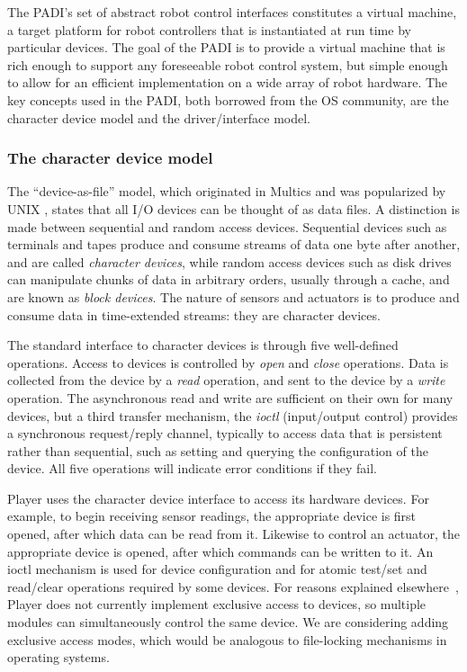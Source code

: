 The PADI's set of abstract robot control interfaces constitutes a virtual
machine, a target platform for robot controllers that is instantiated at
run time by particular devices.  The goal of the PADI is to provide a
virtual machine that is rich enough to support any foreseeable robot control
system, but simple enough to allow for an efficient implementation on a
wide array of robot hardware.  The key concepts used in the PADI, both
borrowed from the OS community, are the character device model and the
driver/interface model.

\subsubsection{The character device model}
The ``device-as-file'' model, which originated in Multics
\cite{32_FeiertagOrganick71} and was popularized by UNIX
\cite{32_RitchieThompson74}, states that all I/O devices can be thought of as
data files. A distinction is made between sequential and random access
devices. Sequential devices such as terminals and tapes produce and consume
streams of data one byte after another, and are called {\em character
devices}, while random access devices such as disk drives can manipulate
chunks of data in arbitrary orders, usually through a cache, and are known
as {\em block devices}. The nature of sensors and actuators is to produce
and consume data in time-extended streams: they are character devices.

The standard interface to character devices is through five
well-defined operations. Access to devices is controlled by {\em open}
and {\em close} operations. Data is collected from the device by a
{\em read} operation, and sent to the device by a {\em write}
operation.  The asynchronous read and write are sufficient on their
own for many devices, but a third transfer mechanism, the {\em ioctl}
(input/output control) provides a synchronous request/reply channel,
typically to access data that is persistent rather than sequential,
such as setting and querying the configuration of the device. All five
operations will indicate error conditions if they fail.

Player uses the character device interface to access its hardware devices.
For example, to begin receiving sensor readings, the appropriate device is
first opened, after which data can be read from it.  Likewise to control
an actuator, the appropriate device is opened, after which commands can be
written to it.  An ioctl mechanism is used for device configuration and for
atomic test/set and read/clear operations required by some devices. For
reasons explained elsewhere~\cite{32_GerkeyVaughan01a,32_GerkeyVaughanHoward03},
Player does not currently implement exclusive access to devices, so
multiple modules can simultaneously control the same device.  We are
considering adding exclusive access modes, which would be analogous to
file-locking mechanisms in operating systems.

